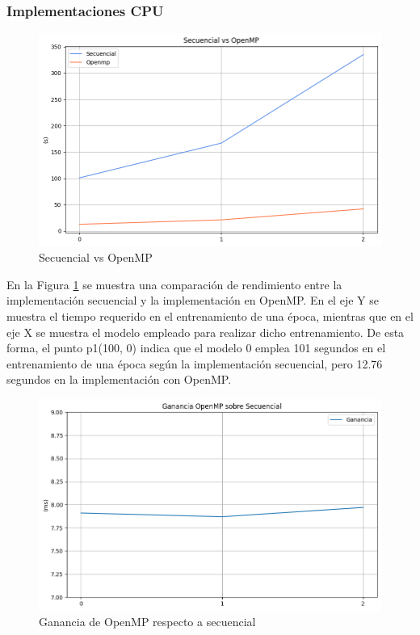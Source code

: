 \subsubsection{Implementaciones CPU}

\begin{figure}[H]
	\centering
	\includegraphics[scale=0.5]{imagenes/sec_openmp.png}  
	\caption{Secuencial vs OpenMP}
	\label{fig:sec_openmp}
\end{figure}

En la Figura \ref{fig:sec_openmp} se muestra una comparación de rendimiento entre la implementación secuencial y la implementación en OpenMP. En el eje Y se muestra el tiempo requerido en el entrenamiento de una época, mientras que en el eje X se muestra el modelo empleado para realizar dicho entrenamiento. De esta forma, el punto p1(100, 0) indica que el modelo 0 emplea 101 segundos en el entrenamiento de una época según la implementación secuencial, pero 12.76 segundos en la implementación con OpenMP.

\begin{figure}[H]
	\centering
	\includegraphics[scale=0.5]{imagenes/ganancia_sec_openmp.png}  
	\caption{Ganancia de OpenMP respecto a secuencial}
	\label{fig:ganancia_sec_openmp}
\end{figure}

